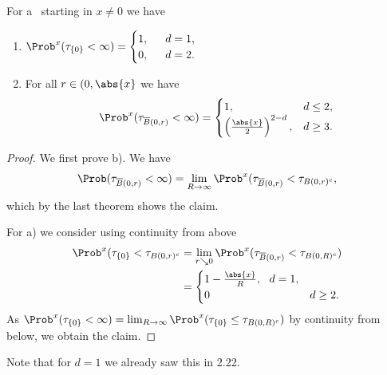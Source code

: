 \begin{cor}
For a \BMd\ starting in $x \not =0$ we have
\begin{enumerate}[label=\alph*)]
\item $\Prob^x(\tau_{\{0\}}<\infty)=\begin{cases}
1,~~&d=1,\\
0, &d=2.
\end{cases}$
\item For all $r \in (0,\abs{x}$ we have
\begin{align*}
\Prob^x(\tau_{\overline{B}(0,r)}<\infty)=
\begin{cases}
1,~~&d \leq 2,\\
\left(\frac{\abs{x}}{2}\right)^{2-d},&d\geq 3.
\end{cases}
\end{align*}
\end{enumerate}
\end{cor}
\begin{proof}
We first prove b). We have
\begin{align*}
\Prob(\tau_{\overline{B}(0,r)}<\infty)=\lim_{R \to \infty} \Prob^x(
\tau_{\overline{B}(0,r)}<\tau_{B(0,r)^c},
\end{align*}
which by the last theorem shows the claim.

For a) we consider using continuity from above
\begin{align*}
\Prob^x(\tau_{\{0\}}<\tau_{B(0,r)^c}&=\lim_{r \searrow 0}
\Prob^x(\tau_{\overline{B}(0,r)} <\tau_{B(0,R)^c})\\
&=\begin{cases}
1-\frac{\abs{x}}{R},~~d=1,\\
0 &d \geq 2.
\end{cases}
\end{align*}
As $\Prob^x(\tau_{\{0\}}<\infty)=\lim_{R \to \infty} \Prob^x(\tau_{\{0\}} \leq \tau_{B(0,R)^c})$ by continuity from below, we obtain the claim.
\end{proof}

Note that for $d=1$ we already saw this in 2.22.

